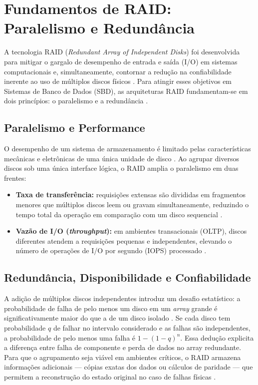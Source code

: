 \documentclass[titlepage]{article}
\begin{document}
\section{Fundamentos de RAID: Paralelismo e Redundância}
\label{sec:paralelismo_redundancia}
A tecnologia RAID (\textit{Redundant Array of Independent Disks}) foi desenvolvida para mitigar o gargalo de desempenho de entrada e saída (I/O) em sistemas computacionais e, simultaneamente, contornar a redução na confiabilidade inerente ao uso de múltiplos discos físicos \cite{silberschatz2020}. Para atingir esses objetivos em Sistemas de Banco de Dados (SBD), as arquiteturas RAID fundamentam-se em dois princípios: o paralelismo e a redundância \cite{silberschatz2020}.

\subsection{Paralelismo e Performance}
O desempenho de um sistema de armazenamento é limitado pelas características mecânicas e eletrônicas de uma única unidade de disco \cite{silberschatz2020}. Ao agrupar diversos discos sob uma única interface lógica, o RAID amplia o paralelismo em duas frentes:
\begin{itemize}
    \item \textbf{Taxa de transferência:} requisições extensas são divididas em fragmentos menores que múltiplos discos leem ou gravam simultaneamente, reduzindo o tempo total da operação em comparação com um disco sequencial \cite{silberschatz2020}.
    \item \textbf{Vazão de I/O (\textit{throughput}):} em ambientes transacionais (OLTP), discos diferentes atendem a requisições pequenas e independentes, elevando o número de operações de I/O por segundo (IOPS) processado \cite{silberschatz2020}.
\end{itemize}

\subsection{Redundância, Disponibilidade e Confiabilidade}
A adição de múltiplos discos independentes introduz um desafio estatístico: a probabilidade de falha de pelo menos um disco em um \textit{array} grande é significativamente maior do que a de um disco isolado \cite{silberschatz2020}. Se cada disco tem probabilidade $q$ de falhar no intervalo considerado e as falhas são independentes, a probabilidade de pelo menos uma falha é $1-(1-q)^n$. Essa dedução explicita a diferença entre falha de componente e perda de dados no array redundante. Para que o agrupamento seja viável em ambientes críticos, o RAID armazena informações adicionais --- cópias exatas dos dados ou cálculos de paridade --- que permitem a reconstrução do estado original no caso de falhas físicas \cite{silberschatz2020}.
\end{document}
